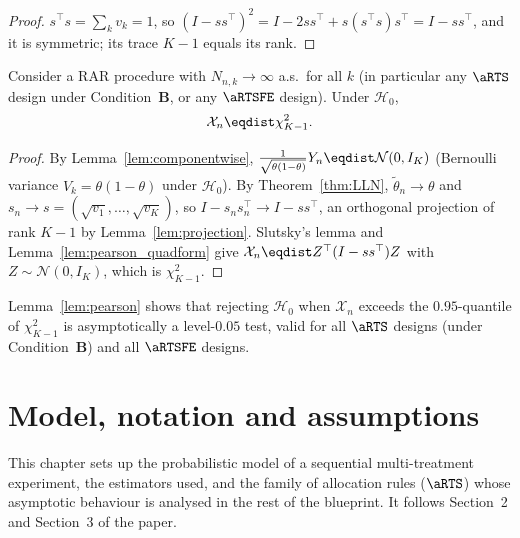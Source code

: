 \begin{proof}\leanok
$s^\top s = \sum_k v_k = 1$, so $(I-ss^\top)^2 = I - 2ss^\top + s(s^\top s)s^\top
 = I - ss^\top$, and it is symmetric; its trace $K-1$ equals its rank.
\end{proof}

\begin{lemma}\label{lem:pearson}
Consider a RAR procedure with $N_{n,k}\to\infty$ a.s.\ for all $k$ (in
particular any $\aRTS$ design under Condition~\textbf{B}, or any $\aRTSFE$
design). Under $\mathcal{H}_0$,
\[
  \mathcal{X}_n \eqdist \chi^2_{K-1}.
\]
\end{lemma}

\begin{proof}
By Lemma~\ref{lem:componentwise}, $\frac{1}{\sqrt{\theta(1-\theta)}}Y_n
\eqdist\mathcal{N}(0,I_K)$ (Bernoulli variance $V_k=\theta(1-\theta)$ under
$\mathcal{H}_0$). By Theorem~\ref{thm:LLN}, $\tilde{\theta}_n\to\theta$ and
$s_n\to s=(\sqrt{v_1},\dots,\sqrt{v_K})$, so $I-s_ns_n^\top\to I-ss^\top$, an
orthogonal projection of rank $K-1$ by Lemma~\ref{lem:projection}. Slutsky's
lemma and Lemma~\ref{lem:pearson_quadform} give
$\mathcal{X}_n\eqdist Z^\top(I-ss^\top)Z$ with $Z\sim\mathcal{N}(0,I_K)$, which is
$\chi^2_{K-1}$.
\end{proof}

\begin{remark}\label{rem:test_level}
Lemma~\ref{lem:pearson} shows that rejecting $\mathcal{H}_0$ when $\mathcal{X}_n$
exceeds the $0.95$-quantile of $\chi^2_{K-1}$ is asymptotically a level-$0.05$
test, valid for all $\aRTS$ designs (under Condition~\textbf{B}) and all
$\aRTSFE$ designs.
\end{remark}


\chapter{Model, notation and assumptions}
\label{chap:model}

This chapter sets up the probabilistic model of a sequential multi-treatment
experiment, the estimators used, and the family of allocation rules
($\aRTS$) whose asymptotic behaviour is analysed in the rest of the blueprint.
It follows Section~2 and Section~3 of the paper.

